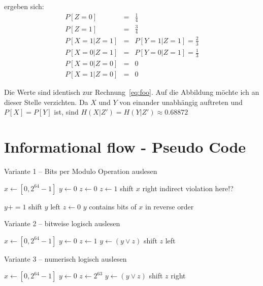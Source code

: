 ergeben sich:
\begin{eqnarray}
    P[Z=0] &=& \frac{1}{4} \\
    P[Z=1] &=& \frac{3}{4} \\
    P[X=1|Z=1] &=& P[Y=1|Z=1] = \frac{2}{3} \\
    P[X=0|Z=1] &=& P[Y=0|Z=1] = \frac{1}{3} \\
    P[X=0|Z=0] &=& 0 \\
    P[X=1|Z=0] &=& 0
\end{eqnarray}

Die Werte sind identisch zur Rechnung~\ref{eq:foo}. Auf die Abbildung möchte ich
an dieser Stelle verzichten. Da $X$ und $Y$ von einander unabhängig auftreten und
$P[X] = P[Y]$ ist, sind $H(X|Z') = H(Y|Z') \approx 0.68872$


\section{Informational flow - Pseudo Code}


\begin{algorithm}
\caption{Variante 1 -- Bits per Modulo Operation auslesen}
\begin{algorithmic}
    \State $x \gets [0,2^{64}-1]$
    \State $y \gets 0 $
    \State $z \gets 0 $
            \State $z \gets 1$
        \EndIf
        \State shift $x$ right
        \Comment indirect violation here!?

            \State $y += 1$
        \EndIf
        \State shift $y$ left
        \State $z \gets 0$
    \EndWhile
    \Comment $y$ contains bits of $x$ in reverse order
\end{algorithmic}
\end{algorithm}

\begin{algorithm}
\caption{Variante 2 -- bitweise logisch auslesen}
\begin{algorithmic}
    \State $x \gets [0,2^{64}-1]$
    \State $y \gets 0 $
    \State $z \gets 1 $
            \State $y \gets (y \lor z)$
        \EndIf
        \State shift $z$ left
    \EndFor
\end{algorithmic}
\end{algorithm}

\begin{algorithm}
\caption{Variante 3 -- numerisch logisch auslesen}
\begin{algorithmic}
    \State $x \gets [0,2^{64}-1]$
    \State $y \gets 0 $
    \State $z \gets 2^{63} $
            \State $y \gets (y \lor z)$
        \EndIf
        \State shift $z$ right
    \EndWhile
\end{algorithmic}
\end{algorithm}


